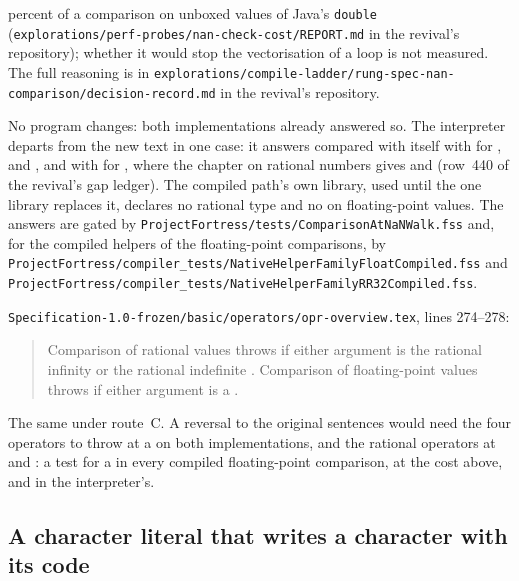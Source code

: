 \begin{description}
percent of a comparison on unboxed values of Java's \texttt{double}
(\nolinkurl{explorations/perf-probes/nan-check-cost/REPORT.md} in the
revival's repository); whether it would stop the vectorisation of a loop is not
measured.
The full reasoning is in
\nolinkurl{explorations/compile-ladder/rung-spec-nan-comparison/decision-record.md}
in the revival's repository.
\item[Effect] No program changes: both implementations already answered so.
The interpreter departs from the new text in one case: it answers 
compared with itself with  for \EXP{=}, \EXP{\leq} and \EXP{\geq}, and
with  for , where the chapter on rational numbers gives
 and  (row~440 of the revival's gap ledger).
The compiled path's own library, used until the one library replaces it,
declares no rational type and no  on floating-point values.
The answers are gated by
\nolinkurl{ProjectFortress/tests/ComparisonAtNaNWalk.fss} and, for the
compiled helpers of the floating-point comparisons, by
\nolinkurl{ProjectFortress/compiler_tests/NativeHelperFamilyFloatCompiled.fss}
and \nolinkurl{ProjectFortress/compiler_tests/NativeHelperFamilyRR32Compiled.fss}.
\item[Original text] \nolinkurl{Specification-1.0-frozen/basic/operators/opr-overview.tex},
lines 274--278:
\begin{quote}
Comparison of rational values throws 
if either argument is the rational infinity  or the
rational indefinite .
Comparison of floating-point values throws 
if either argument is a .
\end{quote}
\item[Route C] The same under route~C.
A reversal to the original sentences would need the four operators to throw
 at a  on both implementations, and the
rational operators  at  and :
a test for a  in every compiled floating-point comparison, at the cost
above, and in the interpreter's.
\end{description}

\subsection{A character literal that writes a character with its code}

